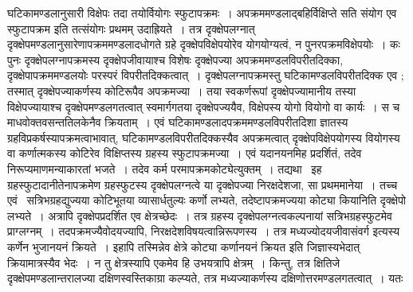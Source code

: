 \documentclass[11pt, openany]{book}
\begin{document}
\noindent घटिकामण्डलानुसारी विक्षेपः तदा तयोर्वियोगः स्फुटापक्रमः~। अपक्रममण्डलाद्बहिर्विक्षिप्ते सति संयोग एव स्फुटापक्रम इति तत्संयोगः प्रथमम् उदाह्रियते~। तत्र दृक्क्षेपलग्नात् दृक्क्षेपमण्डलानुसारेणापक्रममण्डलादधोगते ग्रहे दृक्क्षेपविक्षेपयोरेव योगयोग्यत्वं, न पुनरपक्रमविक्षेपयोः~। कः पुनः दृक्क्षेपलग्नापक्रमस्य दृक्क्षेपजीवायाश्च विशेषः दृक्क्षेपज्या अपक्रममण्डलविपरीतदिक्का, दृक्क्षेपापक्रममण्डलयोः परस्परं विपरीतदिक्कत्वात्~। दृक्क्षेपलग्नापक्रमस्तु घटिकामण्डलविपरीतदिक्क एव ; तस्मात् दृक्क्षेपज्याकर्णस्य कोटिरूपैव अपक्रमज्या~। तया
स्वकर्णरूपां दृक्क्षेपज्यामानीय तस्या विक्षेपज्यायाश्च दृक्क्षेपमण्डलगतत्वात् स्वमार्गगतया दृक्क्षेपज्ययैव, विक्षेपस्य योगो वियोगो वा कार्यः~। स च माधवोक्तवसन्ततिलकेनैव क्रियताम्~। एवं घटिकामण्डलादपक्रममण्डलविपरीतदिशा ज्ञातस्य ग्रहविप्रकर्षस्यापक्रमत्वाभावात्, घटिकामण्डलविपरीतदिक्कस्यैव अपक्रमत्वात् दृक्क्षेपविक्षेपयोगस्य वियोगस्य वा कर्णात्मकस्य कोटिरेव विक्षिप्तस्य ग्रहस्य स्फुटापक्रमज्या~। एवं यदानयनमिह प्रदर्शितं, तदेव निरूप्यमाणमन्याकारतां भजते~। तदेव कर्म {\qt परमापक्रमकोट्ये}त्युक्तम्~। तद्यथा \textendash\ इह ग्रहस्फुटादानीतेनापक्रमेण ग्रहस्फुटस्य दृक्क्षेपलग्नत्वे या दृक्क्षेपज्या निरक्षदेशजा, सा प्रथममानेया~। तच्च एवं \textendash\ 
सत्रिभग्रहद्युज्यया कोटिभूतया व्यासार्धतुल्यः कर्णो लभ्यते, तदेष्टापक्रमज्यया कोट्या कियानिति दृक्क्षेपो लभ्यते~। अत्रापि दृक्क्षेपप्रदर्शित एव क्षेत्रच्छेदः~। तत्र ग्रहस्य दृक्क्षेपलग्नत्वकल्पनायां सत्रिभग्रहस्फुटमेव प्राग्लग्नम्~। तदपक्रमज्यैवोदयज्यापि, निरक्षदेशविषयत्वान्निरूपणस्य~। तत्र {\qt मध्यज्योदयजीवासंवर्ग} इत्यस्य कर्णेन भुजानयनं क्रियते~। इहापि तस्मिन्नेव क्षेत्रे कोट्या कर्णानयनं क्रियत इति जिज्ञास्यभेदात् क्रियामात्रस्यैव भेदः~। न तु क्षेत्रस्यापि एकमेव हि उभयत्रापि क्षेत्रम्~। किन्तु, तत्र क्षितिजे दृक्क्षेपमण्डलान्तरालज्या
दक्षिणस्वस्तिकाग्रा कल्प्यते, तत्र मध्यज्याकर्णस्य दक्षिणोत्तरमण्डलगतत्वात्~। यतः

\newpage
\end{document}
